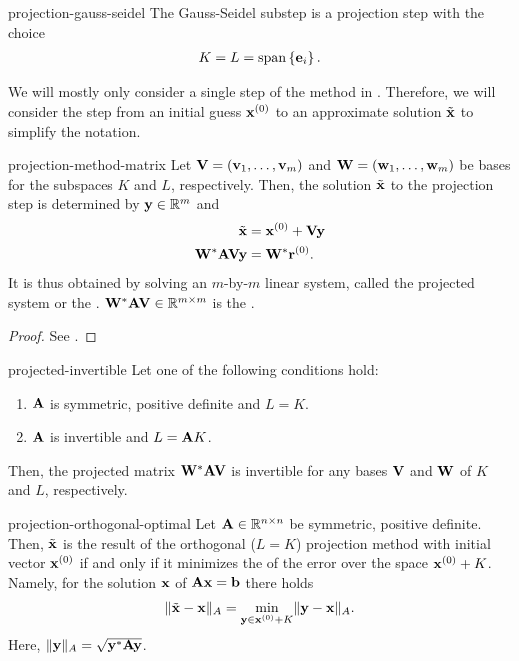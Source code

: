\begin{Example}{projection-gauss-seidel}
  The Gauss-Seidel substep is a projection step with the choice
  \begin{gather}
    K=L=\operatorname{span}\left\{\mathbf e_i\right\}.
  \end{gather}
\end{Example}

\begin{notation}
  We will mostly only consider a single step of the method in
  . Therefore, we will consider
  the step from an initial guess $\mathbf x^{(0)}$ to an approximate solution
  $\tilde {\mathbf x}$ to simplify the notation.
\end{notation}

\begin{Definition}{projection-method-matrix}
  Let $\mathbf V=(\mathbf v_1,\dots,\mathbf v_m)$ and $\mathbf W=(\mathbf w_1,\dots,\mathbf w_m)$ be bases for
  the subspaces $K$ and $L$, respectively. Then, the solution
  $\tilde {\mathbf x}$ to the projection step is determined by $\mathbf y\in\mathbb R^m$ and
  \begin{align}
    \tilde{\mathbf x} &= \mathbf x^{(0)} + \mathbf V\mathbf y\\
    \mathbf W^*\mathbf A\mathbf V \mathbf y &= \mathbf W^* \mathbf r^{(0)}.
  \end{align}
  It is thus obtained by solving an $m$-by-$m$ linear system, called
  the projected system or the . $\mathbf W^*\mathbf A\mathbf V\in\mathbb R^{m\times m}$ is the
  .
\end{Definition}

\begin{proof}
  See \cite[Section 5.1.2]{Saad00}.
\end{proof}

\begin{Theorem}{projected-invertible}
  Let one of the following conditions hold:
  \begin{enumerate}
  \item $\mathbf A$ is symmetric, positive definite and $L=K$.
  \item $\mathbf A$ is invertible and $L = \mathbf A K$.
  \end{enumerate}
  Then, the projected matrix $\mathbf W^*\mathbf A\mathbf V$ is invertible for any
  bases $\mathbf V$ and $\mathbf W$ of $K$ and $L$, respectively.
\end{Theorem}

\begin{Theorem}{projection-orthogonal-optimal}
  Let $\mathbf A\in\mathbb R^{n\times n}$ be symmetric, positive definite. Then,
  $\tilde {\mathbf x}$ is the result of the orthogonal ($L=K$) projection
  method with initial vector $\mathbf x^{(0)}$ if and only if it minimizes
  the  of the error over the space $\mathbf x^{(0)}+K$. Namely, for the
  solution $\mathbf x$ of $\mathbf A\mathbf x=\mathbf b$ there holds
  \begin{gather}
    \lVert\tilde{\mathbf x}-\mathbf x\rVert_A = \min_{\mathbf y\in\mathbf x^{(0)}+K} \lVert\mathbf y-\mathbf x\rVert_A.
  \end{gather}
  Here, $\lVert\mathbf y\rVert_A = \sqrt{\mathbf y^*\mathbf A\mathbf y}$.
\end{Theorem}

